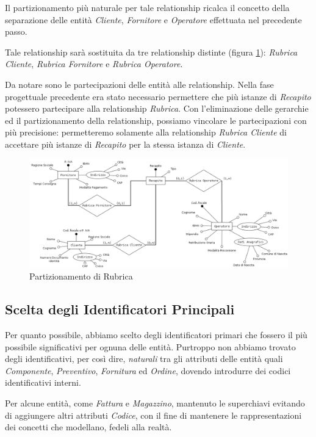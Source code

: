 				Il partizionamento più naturale per tale relationship ricalca il concetto della separazione delle entità \emph{Cliente}, \emph{Fornitore} e \emph{Operatore} effettuata nel precedente passo.

				Tale relationship sarà sostituita da tre relationship distinte (figura \ref{fig:rubrica_refactor}): \emph{Rubrica Cliente}, \emph{Rubrica Fornitore} e \emph{Rubrica Operatore}.

				Da notare sono le partecipazioni delle entità alle relationship. Nella fase progettuale precedente era stato necessario permettere che più istanze di \emph{Recapito} potessero partecipare alla relationship \emph{Rubrica}. Con l'eliminazione delle gerarchie ed il partizionamento della relationship, possiamo vincolare le partecipazioni con più precisione: permetteremo solamente alla relationship \emph{Rubrica Cliente} di accettare più istanze di \emph{Recapito} per la stessa istanza di \emph{Cliente}.

				\begin{figure}
					\centering
					\includegraphics[width=22cm]{images/refactor/persona-recapito.png}
					\caption{Partizionamento di Rubrica}
					\label{fig:rubrica_refactor}
				\end{figure}

	\subsection{Scelta degli Identificatori Principali}

		Per quanto possibile, abbiamo scelto degli identificatori primari che fossero il più possibile significativi per ognuna delle entità. Purtroppo non abbiamo trovato degli identificativi, per così dire, \emph{naturali} tra gli attributi delle entità quali \emph{Componente}, \emph{Preventivo}, \emph{Fornitura} ed \emph{Ordine}, dovendo introdurre dei codici identificativi interni.

		Per alcune entità, come \emph{Fattura} e \emph{Magazzino}, mantenuto le superchiavi evitando di aggiungere altri attributi \emph{Codice}, con il fine di mantenere le rappresentazioni dei concetti che modellano, fedeli alla realtà.

